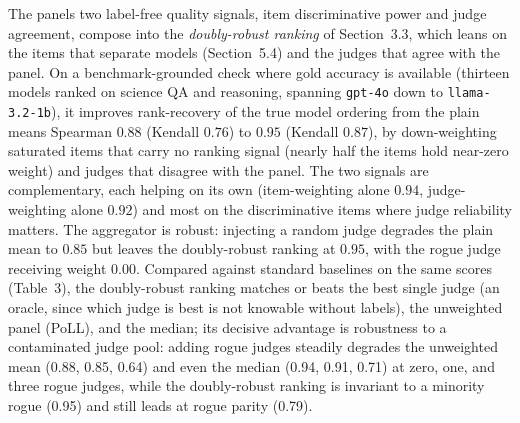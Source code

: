 \documentclass[11pt,a4paper]{article}
\begin{document}
The panel\textquotesingle s two label-free quality signals, item discriminative power and judge agreement, compose into the
\emph{doubly-robust ranking} of Section~3.3, which leans on the items that separate models (Section~5.4)
and the judges that agree with the panel. On a benchmark-grounded check where gold accuracy is available (thirteen
models ranked on science QA and reasoning, spanning \texttt{gpt-4o} down to \texttt{llama-3.2-1b}), it improves
rank-recovery of the true model ordering from the plain mean\textquotesingle s Spearman \(0.88\) (Kendall \(0.76\)) to
\textbf{\(0.95\)} (Kendall \(0.87\)), by down-weighting saturated items that carry no ranking signal (nearly half
the items hold near-zero weight) and judges that disagree with the panel. The two signals are complementary, each
helping on its own (item-weighting alone \(0.94\), judge-weighting alone \(0.92\)) and most on the discriminative items
where judge reliability matters. The aggregator is robust: injecting a random judge degrades the plain mean to \(0.85\)
but leaves the doubly-robust ranking at \(0.95\), with the rogue judge receiving weight \(0.00\). Compared against standard
baselines on the same scores (Table~3), the doubly-robust ranking matches or beats the best single judge (an
oracle, since which judge is best is not knowable without labels), the unweighted panel (PoLL), and the median; its
decisive advantage is robustness to a contaminated judge pool: adding rogue judges steadily degrades the unweighted
mean (0.88, 0.85, 0.64) and even the median (0.94, 0.91, 0.71) at zero, one, and three rogue judges, while the
doubly-robust ranking is invariant to a minority rogue (0.95) and still leads at rogue parity (0.79).
\end{document}

